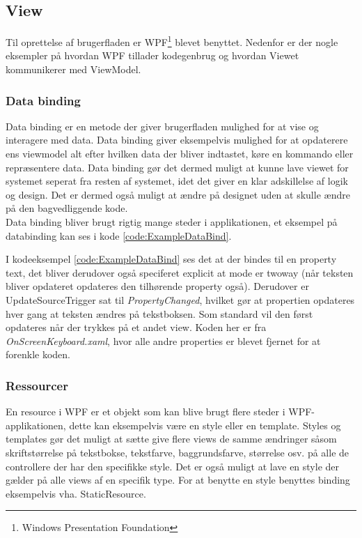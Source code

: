 \subsection*{View}
\label{sec:imple_view}
Til oprettelse af brugerfladen er WPF\footnote{Windows Presentation Foundation} blevet benyttet. Nedenfor er der nogle eksempler på hvordan WPF tillader kodegenbrug og hvordan Viewet kommunikerer med ViewModel.

\subsubsection*{Data binding}
Data binding er en metode der giver brugerfladen mulighed for at vise og interagere med data. Data binding giver eksempelvis mulighed for at opdaterere ens viewmodel alt efter hvilken data der bliver indtastet, køre en kommando eller repræsentere data. Data binding gør det dermed muligt at kunne lave viewet for systemet seperat fra resten af systemet, idet det giver en klar adskillelse af logik og design. Det er dermed også muligt at ændre på designet uden at skulle ændre på den bagvedliggende kode.\\

Data binding bliver brugt rigtig mange steder i applikationen, et eksempel på databinding kan ses i kode \ref{code:ExampleDataBind}.


I kodeeksempel \ref{code:ExampleDataBind} ses det at der bindes til en property text, det bliver derudover også speciferet explicit at mode er twoway (når teksten bliver opdateret opdateres den tilhørende property også). Derudover er UpdateSourceTrigger sat til \textit{PropertyChanged}, hvilket gør at propertien opdateres hver gang at teksten ændres på tekstboksen. Som standard vil den først opdateres når der trykkes på et andet view. Koden her er fra \textit{OnScreenKeyboard.xaml}, hvor alle andre properties er blevet fjernet for at forenkle koden.

\subsubsection*{Ressourcer}
En resource i WPF er et objekt som kan blive brugt flere steder i WPF-applikationen, dette kan eksempelvis være en style eller en template. Styles og templates gør det muligt at sætte give flere views de samme ændringer såsom skriftstørrelse på tekstbokse, tekstfarve, baggrundsfarve, størrelse osv. på alle de controllere der har den specifikke style. Det er også muligt at lave en style der gælder på alle views af en specifik type. For at benytte en style benyttes binding eksempelvis vha. StaticResource.

